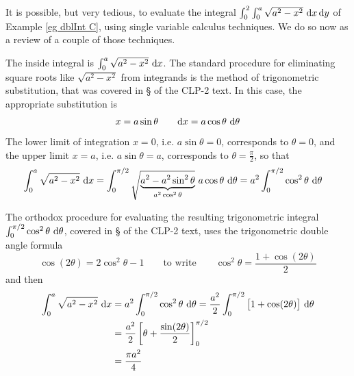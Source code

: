\begin{eg}\label{eg dblInt CC}
It is possible, but very tedious, to evaluate the integral
$\int_0^2\int_0^a \sqrt{a^2-x^2}\ \dee{x}\,\dee{y}$
of Example \ref{eg dblInt C}, using single variable calculus
techniques. We do so now as a review of a couple of those
techniques.

The inside integral is $\int_0^a \sqrt{a^2-x^2}\ \mathrm{d}x$.
The standard procedure for eliminating square roots like $\sqrt{a^2-x^2}$
from integrands is the method of trigonometric substitution, that was
covered in \S{} of the CLP-2 text. In this
case, the appropriate substitution is
\begin{equation*}
x=a\sin\theta\qquad \mathrm{d}x=a\cos\theta\ \mathrm{d}\theta
\end{equation*} 
The lower limit of integration $x=0$, i.e. $a\sin\theta=0$, 
corresponds to $\theta=0$, and the upper limit  $x=a$, i.e. $a\sin\theta=a$, 
corresponds to $\theta=\frac{\pi}{2}$, so that
\begin{align*}
\int_0^a \sqrt{a^2-x^2}\ \mathrm{d}x
&=\int_0^{\pi/2} \sqrt{\underbrace{a^2-a^2\sin^2\theta}_{a^2\cos^2\theta}}
        \ a\cos\theta\ \mathrm{d}\theta
=a^2\int_0^{\pi/2} \cos^2\theta\ \mathrm{d}\theta
\end{align*}

The orthodox procedure for evaluating the resulting trigonometric integral
$\int_0^{\pi/2} \cos^2\theta\ \dee{\theta}$, covered in 
\S{} of the CLP-2 text, uses the trigonometric
double angle formula
\begin{equation*}
\cos(2\theta) = 2\cos^2\theta -1\qquad\text{to write}\qquad
\cos^2\theta =\frac{1+\cos(2\theta)}{2}
\end{equation*}
and then
\begin{align*}
\int_0^a \sqrt{a^2-x^2}\ \mathrm{d}x
&=a^2\int_0^{\pi/2} \cos^2\theta\ \mathrm{d}\theta
=\frac{a^2}{2} \int_0^{\pi/2} \big[1+\cos(2\theta)\big]\ \mathrm{d}\theta \\
&=\frac{a^2}{2}\left[\theta+\frac{\sin(2\theta)}{2}\right]_0^{\pi/2} \\
&=\frac{\pi a^2}{4}
\end{align*}


\end{eg}
